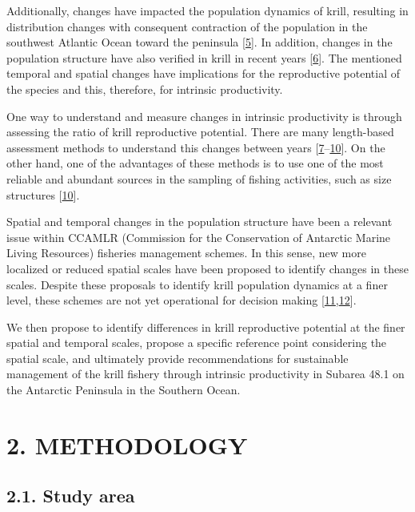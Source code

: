 \documentclass[
]{article}
\begin{document}
Additionally, changes have impacted the population dynamics of krill,
resulting in distribution changes with consequent contraction of the
population in the southwest Atlantic Ocean toward the peninsula
{[}\protect\hyperlink{ref-Atkinson2009}{5}{]}. In addition, changes in
the population structure have also verified in krill in recent years
{[}\protect\hyperlink{ref-Reiss2020}{6}{]}. The mentioned temporal and
spatial changes have implications for the reproductive potential of the
species and this, therefore, for intrinsic productivity.

One way to understand and measure changes in intrinsic productivity is
through assessing the ratio of krill reproductive potential. There are
many length-based assessment methods to understand this changes between
years
{[}\protect\hyperlink{ref-Rudd2017a}{7}--\protect\hyperlink{ref-Canales2021}{10}{]}.
On the other hand, one of the advantages of these methods is to use one
of the most reliable and abundant sources in the sampling of fishing
activities, such as size structures
{[}\protect\hyperlink{ref-Canales2021}{10}{]}.

Spatial and temporal changes in the population structure have been a
relevant issue within CCAMLR (Commission for the Conservation of
Antarctic Marine Living Resources) fisheries management schemes. In this
sense, new more localized or reduced spatial scales have been proposed
to identify changes in these scales. Despite these proposals to identify
krill population dynamics at a finer level, these schemes are not yet
operational for decision making
{[}\protect\hyperlink{ref-Hill2016}{11},\protect\hyperlink{ref-McBride2021}{12}{]}.

We then propose to identify differences in krill reproductive potential
at the finer spatial and temporal scales, propose a specific reference
point considering the spatial scale, and ultimately provide
recommendations for sustainable management of the krill fishery through
intrinsic productivity in Subarea 48.1 on the Antarctic Peninsula in the
Southern Ocean.

\newpage

\hypertarget{methodology}{%
\section{2. METHODOLOGY}\label{methodology}}

\hypertarget{study-area}{%
\subsection{2.1. Study area}\label{study-area}}
\end{document}
